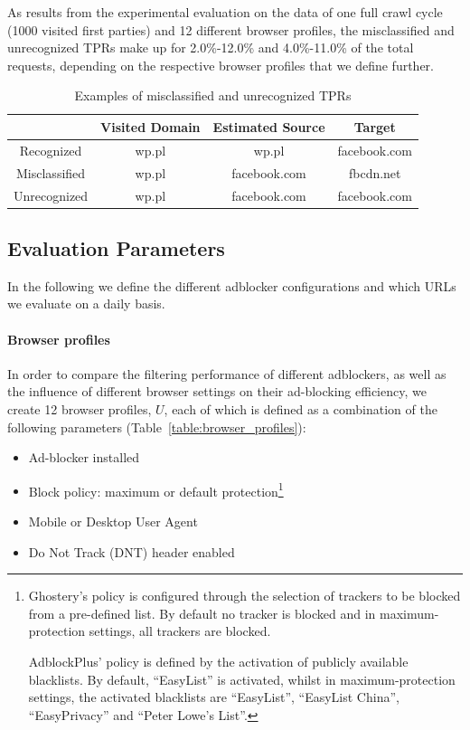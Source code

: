 As results from the experimental evaluation on the data of one full crawl cycle (1000 visited first parties) and 12 different browser profiles, the misclassified and unrecognized TPRs make up for 2.0\%-12.0\% and 4.0\%-11.0\% of the total requests, depending on the respective browser profiles that we define further.

\begin{table}
\centering
\footnotesize
\begin{tabular}{|c|c c c|}

\hline
& Visited Domain & Estimated Source & Target \\
\hline
Recognized & wp.pl & wp.pl & facebook.com \\
Misclassified & wp.pl & facebook.com & fbcdn.net \\
Unrecognized & wp.pl & facebook.com & facebook.com \\
\hline
\end{tabular}
\caption{Examples of misclassified and unrecognized TPRs}
\label{table:false_positive_examples}
\end{table}

\subsection{Evaluation Parameters}

In the following we define the different adblocker configurations and which URLs we evaluate on a daily basis.

\paragraph{Browser profiles}
\label{sec:browser_profiles}
In order to compare the filtering performance of different adblockers, as well as the influence of different browser settings on their ad-blocking efficiency, we create 12 browser profiles, $U$, each of which is defined as a combination of the following parameters (Table~\ref{table:browser_profiles}):

\begin{itemize}
 \item Ad-blocker installed
 \item Block policy: maximum or default protection\footnote{Ghostery's policy is configured through the selection of trackers to be blocked from a pre-defined list. By default no tracker is blocked and in maximum-protection settings, all trackers are blocked.
 
 AdblockPlus' policy is defined by the activation of publicly available blacklists. By default, ``EasyList'' is activated, whilst in maximum-protection settings, the activated blacklists are ``EasyList'', ``EasyList China'', ``EasyPrivacy'' and ``Peter Lowe's List''.}
 \item Mobile or Desktop User Agent
 \item Do Not Track (DNT) header enabled
\end{itemize}

